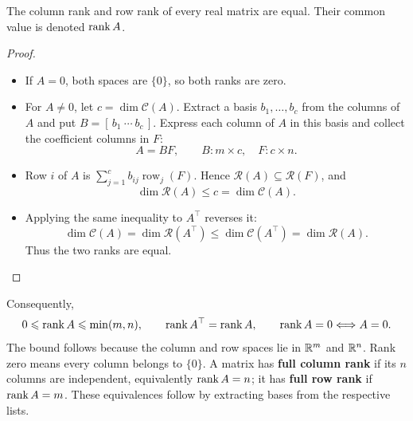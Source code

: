 \begin{theorem}\label{thm:03:row-column}
The column rank and row rank of every real matrix are equal.
Their common value is denoted \(\operatorname{rank} A\).
\end{theorem}
\begin{proof}
\begin{itemize}
\item If \(A=0\), both spaces are \(\{0\}\), so both ranks are zero.
\item For \(A\ne0\), let \(c=\dim\mathcal C(A)\).
Extract a basis \(b_1,\ldots,b_c\) from
the columns of \(A\) and put \(B=[\,b_1\ \cdots\ b_c\,]\).
Express each column of \(A\) in this basis and collect the coefficient columns in \(F\):
\[
A=BF,\qquad B:m\times c,\quad F:c\times n.
\]
\item Row \(i\) of \(A\) is \(\sum_{j=1}^c b_{ij}\operatorname{row}_j(F)\).
Hence \(\mathcal R(A)\subseteq\mathcal R(F)\), and
\[
\dim\mathcal R(A)\leqslant c=\dim\mathcal C(A).
\]
\item Applying the same inequality to \(A^\top\) reverses it:
\[
\dim\mathcal C(A)=\dim\mathcal R(A^\top)
\leqslant\dim\mathcal C(A^\top)=\dim\mathcal R(A).
\]
Thus the two ranks are equal.
\end{itemize}
\end{proof}

Consequently,
\[
0\leqslant\operatorname{rank} A\leqslant\min(m,n),\qquad
\operatorname{rank} A^\top=\operatorname{rank} A,\qquad
\operatorname{rank} A=0\Longleftrightarrow A=0.
\]
The bound follows because the column and row spaces lie in \(\mathbb R^m\) and
\(\mathbb R^n\). Rank zero means every column belongs to \(\{0\}\).
A matrix has \textbf{full column rank} if its \(n\) columns are independent,
equivalently \(\operatorname{rank} A=n\); it has \textbf{full row rank} if \(\operatorname{rank} A=m\).
These equivalences follow by extracting bases from the respective lists.

